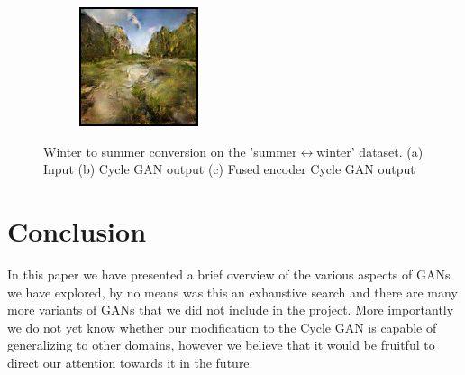\documentclass{article}
\begin{document}
\begin{figure}[H]
\begin{subfigure}{.165\textwidth}
        \includegraphics[width=0.75\linewidth]{output_2_modified_cycle_gan.png}
        \caption{}
    \end{subfigure}
    
    \caption{Winter to summer conversion on the 'summer$\leftrightarrow$winter' dataset. (a) Input (b) Cycle GAN output (c) Fused encoder Cycle GAN output}
    \label{fig:my_label}
\end{figure}

\section{Conclusion}
In this paper we have presented a brief overview of the various aspects of GANs we have explored, by no means was this an exhaustive search and there are many more variants of GANs that we did not include in the project. More importantly we do not yet know whether our modification to the Cycle GAN is capable of generalizing to other domains, however we believe that it would be fruitful to direct our attention towards it in the future.



\end{document}
